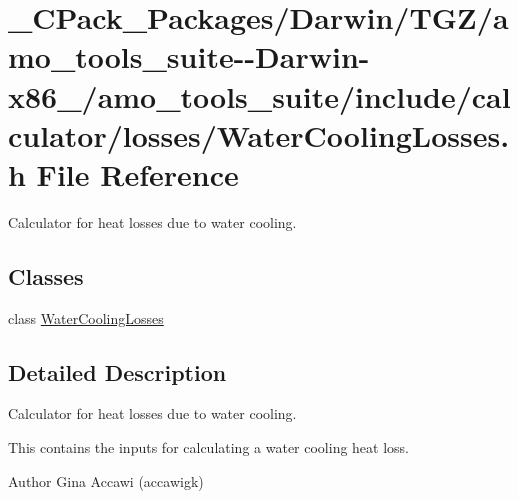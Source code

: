 \hypertarget{___c_pack___packages_2_darwin_2_t_g_z_2amo__tools__suite--_darwin-x86__64_2amo__tools__suite_2in6cb7c0455b96fe6753b4e500ccdfd0eb}{}\section{\+\_\+\+C\+Pack\+\_\+\+Packages/\+Darwin/\+T\+G\+Z/amo\+\_\+tools\+\_\+suite-\/-\/\+Darwin-\/x86\+\_/amo\+\_\+tools\+\_\+suite/include/calculator/losses/\+Water\+Cooling\+Losses.h File Reference}
\label{___c_pack___packages_2_darwin_2_t_g_z_2amo__tools__suite--_darwin-x86__64_2amo__tools__suite_2in6cb7c0455b96fe6753b4e500ccdfd0eb}


Calculator for heat losses due to water cooling.  


\subsection*{Classes}
\begin{DoxyCompactItemize}
\item 
class \hyperlink{class_water_cooling_losses}{Water\+Cooling\+Losses}
\end{DoxyCompactItemize}


\subsection{Detailed Description}
Calculator for heat losses due to water cooling. 

This contains the inputs for calculating a water cooling heat loss.

\begin{DoxyAuthor}{Author}
Gina Accawi (accawigk) 
\end{DoxyAuthor}

